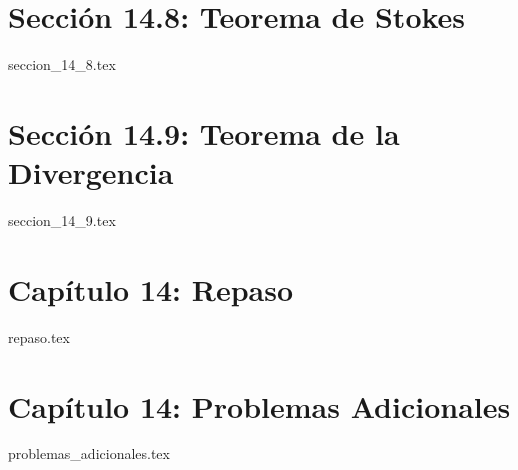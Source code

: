 \section*{Sección 14.8: Teorema de Stokes}
{seccion_14_8.tex}

\section*{Sección 14.9: Teorema de la Divergencia}
{seccion_14_9.tex}

\section*{Capítulo 14: Repaso}
{repaso.tex}

\section*{Capítulo 14: Problemas Adicionales}
{problemas_adicionales.tex}
